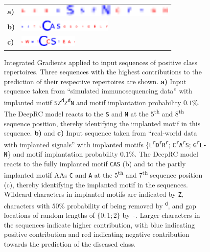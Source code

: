 \documentclass[oneside]{book}
\begin{document}
\begin{figure}[htp]
    \begin{center}
        \begingroup
        
        \setlength{\tabcolsep}{10pt} %
        \renewcommand{\arraystretch}{1.5} %
        \begin{tabular}{ll}
    \textbf{a)} & \includegraphics[height=16pt]{figures/extracted_motifs/sim_016_cf0_v0080_input_intgrds.pdf}\\
    \textbf{b)} & \includegraphics[height=16pt]{figures/extracted_motifs/implanted_p001_multiple_motifs_input_intgrds_2.pdf}\\
    \textbf{c)} & \includegraphics[height=16pt]{figures/extracted_motifs/implanted_p001_multiple_motifs_input_intgrds_1.pdf}
        \end{tabular}
        
        \endgroup
   \caption[Interpretation of the DeepRC classifier]{Integrated Gradients applied to input sequences of positive class repertoires.
   Three sequences with the highest contributions to the prediction of their respective repertoires are shown.
   \textbf{a)} Input sequence taken from ``simulated immunosequencing data''
   with implanted motif \texttt{SZ\textsuperscript{d}Z\textsuperscript{d}N} 
   and motif implantation probability $0.1\%$.
   The DeepRC model reacts to the \texttt{S} and \texttt{N} at the 5\textsuperscript{th} and 8\textsuperscript{th} sequence position,
   thereby identifying the implanted motif in this sequence. 
   \textbf{b)} and \textbf{c)} Input sequence taken from ``real-world data with implanted signals''
   with implanted motifs \{\texttt{L\textsuperscript{r}D\textsuperscript{r}R\textsuperscript{r}}; \texttt{C\textsuperscript{r}A\textsuperscript{r}S}; \texttt{G\textsuperscript{r}L-N}\} 
   and motif implantation probability $0.1\%$.
   The DeepRC model reacts to the fully implanted motif \texttt{CAS} (b)
   and to the partly implanted motif AAs \texttt{C} and \texttt{A} at the 5\textsuperscript{th} and 7\textsuperscript{th} sequence position (c),
   thereby identifying the implanted motif in the sequences.
    Wildcard characters in implanted motifs are indicated by \texttt{Z},
    characters with $50\%$ probability of being removed by \texttt{\textsuperscript{d}}, and
    gap locations of random lengths of $\{0;1;2\}$ by \texttt{-}.
    Larger characters in the sequences indicate higher contribution,
    with blue indicating positive contribution and red indicating negative contribution towards the prediction of the diseased class.
   \label{fig:simulations_input_ig}}
   \end{center}
\end{figure}
\end{document}
